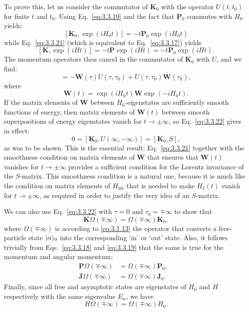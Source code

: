 To prove this, let us consider the commutator of $\mathbf{K}_0$ with the operator
$U(t,t_0)$ for finite $t$ and $t_0$. Using Eq.~\eqref{eq:3.3.10} and the fact that
$\mathbf{P}_0$ commutes with $H_0$ yields:
\[
[\mathbf{K}_0,\exp(iH_0t)]=-t\mathbf{P}_0\exp(iH_0t)
\]
while Eq.~\eqref{eq:3.3.21} (which is equivalent to Eq.~\eqref{eq:3.3.17}) yields
\[
[\mathbf{K},\exp(iHt)]=-t\mathbf{P}\exp(iHt)
=-t\mathbf{P}_0\exp(iHt).
\]
The momentum operators then cancel in the commutator of $\mathbf{K}_0$ with $U$,
and we find:
\begin{equation}
[\mathbf{K}_0,U(\tau,\tau_0)]
=-\mathbf{W}(\tau)U(\tau,\tau_0)+U(\tau,\tau_0)\mathbf{W}(\tau_0),
\tag{3.3.22}\label{eq:3.3.22}
\end{equation}
where
\begin{equation}
\mathbf{W}(t)=\exp(iH_0t)\mathbf{W}\exp(-iH_0t).
\tag{3.3.23}\label{eq:3.3.23}
\end{equation}
If the matrix elements of $\mathbf{W}$ between $H_0$-eigenstates are sufficiently
smooth functions of energy, then matrix elements of $\mathbf{W}(t)$ between smooth
superpositions of energy eigenstates vanish for $t\to\pm\infty$, so Eq.~\eqref{eq:3.3.22}
gives in effect:
\begin{equation}
0=[\mathbf{K}_0,U(\infty,-\infty)]=[\mathbf{K}_0,S],
\tag{3.3.24}\label{eq:3.3.24}
\end{equation}
as was to be shown. This is the essential result: Eq.~\eqref{eq:3.3.21} together with the
smoothness condition on matrix elements of $\mathbf{W}$ that ensures that
$\mathbf{W}(t)$ vanishes for $t\to\pm\infty$ provides a sufficient condition for
the Lorentz invariance of the $S$-matrix. This smoothness condition is a natural
one, because it is much like the condition on matrix elements of $H_{\mathrm{int}}$
that is needed to make $H_I(t)$ vanish for $t\to\pm\infty$, as required in order
to justify the very idea of an $S$-matrix.

We can also use Eq.~\eqref{eq:3.3.22} with $\tau=0$ and $\tau_0=\mp\infty$ to show that
\begin{equation}
\mathbf{K}\Omega(\mp\infty)=\Omega(\mp\infty)\mathbf{K}_0,
\tag{3.3.25}\label{eq:3.3.25}
\end{equation}
where $\Omega(\mp\infty)$ is according to \eqref{eq:3.1.13} the operator that converts a
free-particle state $\lvert \alpha\rangle_0$ into the corresponding `in' or `out' state.
Also, it follows trivially from Eqs.~\eqref{eq:3.3.18} and \eqref{eq:3.3.19} that the same is true
for the momentum and angular momentum:
\begin{align}
\mathbf{P}\Omega(\mp\infty)&=\Omega(\mp\infty)\mathbf{P}_0,
&\tag{3.3.26}\label{eq:3.3.26}\\
\mathbf{J}\Omega(\mp\infty)&=\Omega(\mp\infty)\mathbf{J}_0.
&\tag{3.3.27}\label{eq:3.3.27}
\end{align}
Finally, since all free and asymptotic states are eigenstates of $H_0$ and $H$
respectively with the same eigenvalue $E_\alpha$, we have
\begin{equation}
H\Omega(\mp\infty)=\Omega(\mp\infty)H_0.
\tag{3.3.28}\label{eq:3.3.28}
\end{equation}

